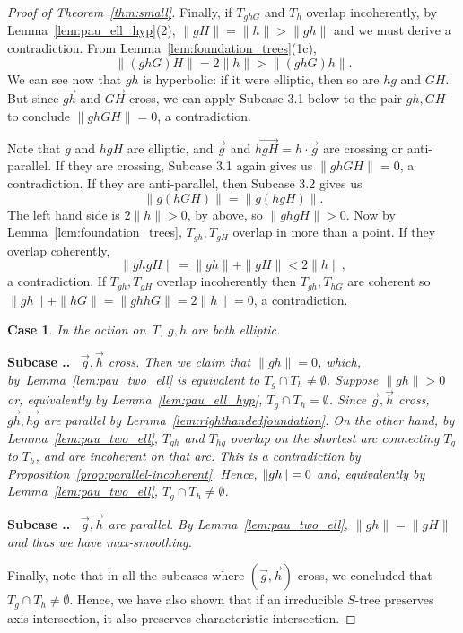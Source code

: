 \documentclass[11pt]{amsart}
\newcommand{\ora}[1]{\overrightarrow{#1}}
\numberwithin{equation}{section}
\numberwithin{figure}{section}
\newtheorem{case}{Case}
\newcounter{subcase}[case]
\newenvironment{subcase}%
  {\smallskip\par\refstepcounter{subcase}\noindent\textbf{Subcase \thecase.\thesubcase.}\ \begingroup\itshape}%
  {\endgroup}
\theoremstyle{definition}
\theoremstyle{plain}
\DeclarePairedDelimiter\norm{\lVert}{\rVert}
\begin{document}
\begin{proof}[Proof of Theorem~\ref{thm:small}]
Finally, if $T_{ghG}$ and $T_{h}$ overlap incoherently, by
Lemma~\ref{lem:pau_ell_hyp}(2), $\|gH\| = \|h\| > \|gh\|$ and we must
derive a contradiction. From
Lemma~\ref{lem:foundation_trees}(1c),
\[
\|(ghG)H\|=2\|h\| > \|(ghG)h\|.
\]
We can see now that $gh$ is hyperbolic: if it were elliptic, then so are $hg$
and $GH$. But since $\ora{gh}$ and $\ora{GH}$ cross, we can apply
Subcase 3.1 below to the pair $gh, GH$ to conclude $\|ghGH\| = 0$, a
contradiction.

Note that $g$ and $hgH$ are elliptic, and $\ora{g}$ and $\ora{hgH} = h
\cdot \ora{g}$ are
crossing or anti-parallel. If they are crossing, Subcase 3.1
again gives us
$\|ghGH\|=0$, a contradiction.
If they are anti-parallel, then Subcase 3.2 gives us
\[
\|g(hGH)\| = \|g(hgH)\|.
\]
The left hand side is $2\|h\|>0$, by above, so $\|ghgH\|>0$.
Now by
Lemma~\ref{lem:foundation_trees}, $T_{gh}, T_{gH}$ overlap in more than a point.
 If they overlap coherently,
\[
\|ghgH\| =\| gh\| + \|gH\| < 2\|h\|,
\]
a contradiction.
If $T_{gh},T_{gH}$ overlap incoherently then $T_{gh},T_{hG}$ are coherent
so $\|gh\|+\|hG\|=\|ghhG\|=2\|h\|=0$, a contradiction.

\begin{case}
  In the action on~$T$, $g,h$ are both elliptic.
\end{case}
\begin{subcase}
$\ora{g},\ora{h}$ cross.
\end{subcase}
Then we claim that $\|gh\|=0$, which, by~Lemma~\ref{lem:pau_two_ell} is equivalent to $T_g \cap T_h \neq \emptyset$.  Suppose $\|gh\|>0$ or, equivalently by Lemma~\ref{lem:pau_ell_hyp}, $T_g \cap T_h = \emptyset$.
Since $\ora{g},\ora{h}$ cross, $\ora{gh},\ora{hg}$ are parallel by Lemma~\ref{lem:righthandedfoundation}.
On the other hand, by Lemma~\ref{lem:pau_two_ell}, $T_{gh}$ and
$T_{hg}$ overlap on the shortest arc connecting
$T_g$ to $T_h$, and are incoherent on that arc.
This is a contradiction by Proposition~\ref{prop:parallel-incoherent}. Hence, $\norm{gh}=0$ and, equivalently by Lemma~\ref{lem:pau_two_ell}, $T_g \cap T_h \neq \emptyset$.

\begin{subcase}
  $\ora{g}, \ora{h}$ are parallel. \end{subcase}
By Lemma~\ref{lem:pau_two_ell}, $\| gh\| = \| gH\|$ and
thus we have max\hyp smoothing.

Finally, note that in all the subcases where
$(\ora{g},\ora{h})$ cross,
we concluded that $T_g \cap T_h \neq \emptyset$.
Hence, we have also shown that if an irreducible $S$-tree preserves
axis intersection, it also preserves characteristic intersection.
\end{proof}
\end{document}
